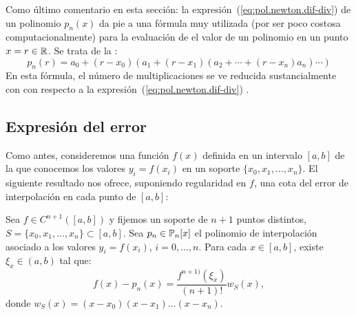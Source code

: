 Como último comentario en esta sección: la
expresión~(\ref{eq:pol.newton.dif-div}) de un polinomio $p_n(x)$ da
pie a una fórmula muy utilizada (por ser poco costosa
computacionalmente) para la evaluación de el valor de un polinomio en un punto $x=r\in\operatorname{{\mathbb R}}$. Se trata de la :
\begin{equation*}
  p_n(r) = a_0 + (r-x_0)(a_1 + (r-x_1)(a_2 + \cdots + (r-x_n)a_n)\cdots)
\end{equation*}
En esta fórmula, el número de multiplicaciones se ve reducida
sustancialmente con con respecto a la
expresión~(\ref{eq:pol.newton.dif-div}) .


\subsection{Expresión del error}
\label{sec:error-interpol-lagrange}
Como antes, consideremos una función $f(x)$ definida en un intervalo
$[a,b]$ de la que conocemos los valores $y_i=f(x_i)$ en un soporte
$\{x_0,x_1,\dots,x_n\}$. El siguiente resultado nos ofrece, suponiendo
regularidad en $f$, una cota del error de interpolación en cada punto
de $[a,b]$:
\begin{theorem}
  \label{thm:error-interpol-lagrange}
  Sea $f\in C^{n+1}([a,b])$ y fijemos un soporte de $n+1$ puntos
  distintos, $S=\{x_0,x_1,\dots,x_n\}\subset[a,b]$. Sea
  $p_n\in\operatorname{{\mathbb P}}_n[x]$ el polinomio de interpolación asociado a los valores
  $y_i=f(x_i)$, $i=0,\dots,n$. Para cada $x\in[a,b]$, existe $\xi_x\in
  (a,b)$ tal que:
  \begin{equation}
    \label{eq:expresion-error-interpol}
    f(x)-p_n(x)=\frac{f^{n+1)}(\xi_x)}{(n+1)!} w_S(x),
  \end{equation}
  donde $w_S(x)=(x-x_0)(x-x_1)\dots(x-x_n).$
\end{theorem}

